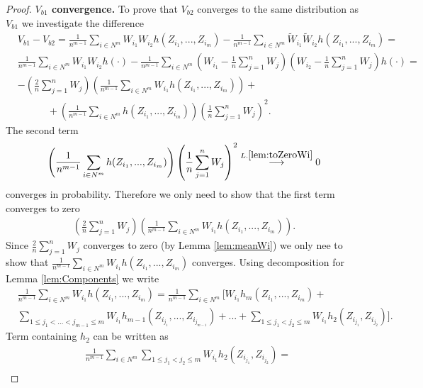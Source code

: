 \documentclass{article} %
\begin{document}
\begin{proof}
\textbf{$V_{b1}$ convergence.} To prove that  $V_{b2}$ converges to the same distribution as $V_{b1}$ we investigate the difference
\begin{align}
&V_{b1} - V_{b2} = \frac{1} {n^{m-1}} \sum_{i \in N^m} W_{i_1}W_{i_2} h(Z_{i_1},...,Z_{i_m}) - \frac{1} {n^{m-1}} \sum_{i \in N^m} \tilde W_{i_1} \tilde W_{i_2} h(Z_{i_1},...,Z_{i_m}) = \\
&\frac{1} {n^{m-1}} \sum_{i \in N^m} W_{i_1}W_{i_2} h(\cdot) - \frac{1} {n^{m-1}} \sum_{i \in N^m}  (W_{i_1} -\frac 1 n \sum_{j=1}^n W_j ) (W_{i_2} -\frac 1 n \sum_{j=1}^n W_j ) h(\cdot) = \\
&-\left(\frac 2 n \sum_{j=1}^n W_j \right) \left( \frac{1} {n^{m-1}} \sum_{i \in N^{m}} W_{i_1} h(Z_{i_1},...,Z_{i_m}) \right) + \\
& \quad \quad \quad + \left(\frac{1} {n^{m-1}} \sum_{i \in N^{m}}  h(Z_{i_1},...,Z_{i_m}) \right) \left(\frac 1 n \sum_{j=1}^n W_j \right)^2.
\end{align} 
The second term
\begin{align}
\left(\frac{1} {n^{m-1}} \sum_{i \in N^{m}}  h(Z_{i_1},...,Z_{i_m}) \right) \left(\frac 1 n \sum_{j=1}^n W_j \right)^2 \overset{L. \ref{lem:toZeroWi}}{\longrightarrow} 0 
\end{align}
converges in probability. Therefore we only need to show that the first term converges to zero
\begin{align}
\label{eq:firstTerm}
\left(\frac 2 n \sum_{j=1}^n W_j \right) \left( \frac{1} {n^{m-1}} \sum_{i \in N^{m}} W_{i_1} h(Z_{i_1},...,Z_{i_m}) \right).
\end{align}
Since $\frac 2 n \sum_{j=1}^n W_j$ converges to zero (by Lemma \ref{lem:meanWi}) we only nee to show that $\frac{1} {n^{m-1}} \sum_{i \in N^{m}} W_{i_1} h(Z_{i_1},...,Z_{i_m})$ converges. Using decomposition for Lemma \ref{lem:Components} we write
\begin{align}
\label{eq:xyz}
&\frac{1} {n^{m-1}} \sum_{i \in N^{m}} W_{i_1} h(Z_{i_1},...,Z_{i_m}) =\frac{1} {n^{m-1}}  \sum_{i \in N^m}  \Big[ W_{i_1}    h_m(Z_{i_1},...,Z_{i_m})  + \\ 
 & \sum_{1 \leq j_1 < ...<j_{m-1} \leq m } W_{i_1}  h_{m-1}(Z_{i_{j_1}},...,Z_{i_{j_{m-1}}})   + ... + \sum_{1 \leq j_1 < j_2 \leq m } W_{i_1}  h_2(Z_{i_{j_1}},Z_{i_{j_2}}) \Big].
\end{align}
Term containing $h_2$ can be written as
\begin{align}
&\frac{1} {n^{m-1}} \sum_{i \in N^{m}} \sum_{1 \leq j_1 < j_2 \leq m } W_{i_1}  h_2(Z_{i_{j_1}},Z_{i_{j_2}}) = \\

\end{align}
\end{proof}
\end{document}
